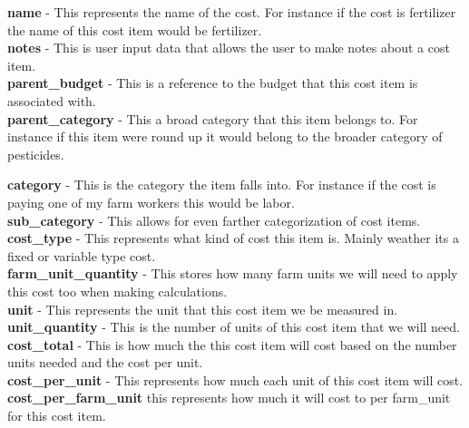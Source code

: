 \documentclass[onecolumn, draftclsnofoot,10pt, compsoc]{article}
\begin{document}
				\textbf{name} - This represents the name of the cost. For instance if the cost is fertilizer the name of this cost item would be fertilizer.\\
				
				\textbf{notes} - This is user input data that allows the user to make notes about a cost item.\\
				
				\textbf{parent\_budget} - This is a reference to the budget that this cost item is associated with.\\
				
				\textbf{parent\_category} - This a broad category that this item belongs to. For instance if this item were round up it would belong to the broader category of pesticides.
				
				\textbf{category} - This is the category the item falls into. For instance if the cost is paying one of my farm workers this would be labor.\\
				
				\textbf{sub\_category} - This allows for even farther categorization of cost items.\\
				
				\textbf{cost\_type} - This represents what kind of cost this item is. Mainly weather its a fixed or variable type cost.\\
				
				\textbf{farm\_unit\_quantity} - This stores how many farm units we will need to apply this cost too when making calculations.\\
				
				\textbf{unit} - This represents the unit that this cost item we be measured in.\\
				
				\textbf{unit\_quantity} - This is the number of units of this cost item that we will need.\\
				
				\textbf{cost\_total} - This is how much the this cost item will cost based on the number units needed and the cost per unit.\\
				
				\textbf{cost\_per\_unit} - This represents how much each unit of this cost item will cost.\\
				
				\textbf{cost\_per\_farm\_unit} \- this represents how much it will cost to per farm\_unit for this cost item.\\
			
\end{document}

